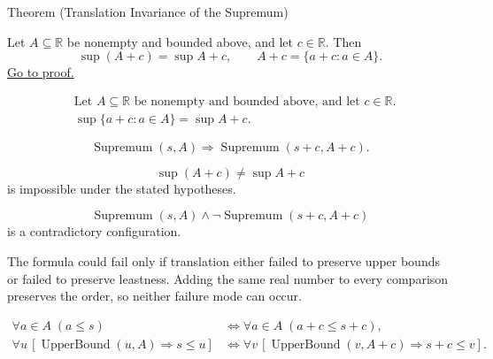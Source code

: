 
\begin{theorembox}{Theorem (Translation Invariance of the Supremum)}
\begin{theorem}
\label{thm:translation-invariance-supremum}
Let $A\subseteq\mathbb{R}$ be nonempty and bounded above, and let $c\in\mathbb{R}$. Then
\[
  \sup(A+c)=\sup A+c,
  \qquad
  A+c=\{a+c:a\in A\}.
\]
\hyperref[prf:translation-invariance-supremum]{Go to proof.}
\end{theorem}
\end{theorembox}

\begin{remark*}
\[
\begin{aligned}
&\text{Let }A\subseteq\mathbb{R}\text{ be nonempty and bounded above, and let }c\in\mathbb{R}.\\
&\sup\{a+c:a\in A\}=\sup A+c.
\end{aligned}
\]
\end{remark*}

\begin{remark*}
\[
\operatorname{Supremum}(s,A)
\Longrightarrow
\operatorname{Supremum}(s+c,A+c).
\]
\end{remark*}

\begin{remark*}
\[
\sup(A+c)\ne \sup A+c
\]
is impossible under the stated hypotheses.
\end{remark*}

\begin{remark*}
\[
\operatorname{Supremum}(s,A)\land \neg\operatorname{Supremum}(s+c,A+c)
\]
is a contradictory configuration.
\end{remark*}

\begin{remark*}
The formula could fail only if translation either failed to preserve upper bounds or failed to preserve leastness. Adding the same real number to every comparison preserves the order, so neither failure mode can occur.
\end{remark*}

\begin{remark*}
\[
\begin{aligned}
\forall a\in A\;(a\le s)
&\Longleftrightarrow
\forall a\in A\;(a+c\le s+c),\\
\forall u\,[\operatorname{UpperBound}(u,A)\Longrightarrow s\le u]
&\Longleftrightarrow
\forall v\,[\operatorname{UpperBound}(v,A+c)\Longrightarrow s+c\le v].
\end{aligned}
\]
\end{remark*}

